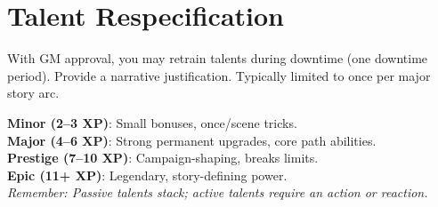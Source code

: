 \documentclass[12pt,a4paper]{book}
\begin{document}
\section{Talent Respecification}
\label{sec:talent-respec}
With GM approval, you may retrain talents during downtime (one downtime period). Provide a narrative justification. Typically limited to once per major story arc.

\begin{tcolorbox}[colback=purple!5!white,colframe=purple!75!black,title=\textbf{Talent Selection Quick Reference},fonttitle=\bfseries,breakable]
\textbf{Minor (2--3 XP)}: Small bonuses, once/scene tricks. \\
\textbf{Major (4--6 XP)}: Strong permanent upgrades, core path abilities. \\
\textbf{Prestige (7--10 XP)}: Campaign-shaping, breaks limits. \\
\textbf{Epic (11+ XP)}: Legendary, story-defining power. \\[2mm]
\textit{Remember: Passive talents stack; active talents require an action or reaction.}
\end{tcolorbox}

\printindex
\end{document}
